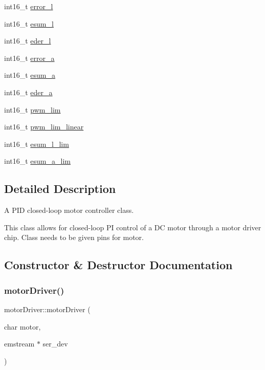 \begin{DoxyCompactItemize}
int16\+\_\+t \mbox{\hyperlink{classmotorDriver_a1167aa02f79f3ce85a38138b51e11c02}{error\+\_\+l}}
\item 
int16\+\_\+t \mbox{\hyperlink{classmotorDriver_aaa3f3b3f21f2b4be049289a28ee49c44}{esum\+\_\+l}}
\item 
int16\+\_\+t \mbox{\hyperlink{classmotorDriver_a5685e659a36278ead61528aaa5ae7df4}{eder\+\_\+l}}
\item 
int16\+\_\+t \mbox{\hyperlink{classmotorDriver_a5e3b5660f0764a6751b533893feb6b7b}{error\+\_\+a}}
\item 
int16\+\_\+t \mbox{\hyperlink{classmotorDriver_a8d327e1eed5b8eedf1b2289a675890f3}{esum\+\_\+a}}
\item 
int16\+\_\+t \mbox{\hyperlink{classmotorDriver_a3392381240d368f578b6f801984ac074}{eder\+\_\+a}}
\item 
int16\+\_\+t \mbox{\hyperlink{classmotorDriver_a54e6e6cddb7e7ef584cbe58449e08650}{pwm\+\_\+lim}}
\item 
int16\+\_\+t \mbox{\hyperlink{classmotorDriver_a842b7fc2c8401ae9a2919982c746da6d}{pwm\+\_\+lim\+\_\+linear}}
\item 
int16\+\_\+t \mbox{\hyperlink{classmotorDriver_a43969a01dd52d129d84243585dc996a9}{esum\+\_\+l\+\_\+lim}}
\item 
int16\+\_\+t \mbox{\hyperlink{classmotorDriver_a149914d07b894ca8201e6e9954862072}{esum\+\_\+a\+\_\+lim}}
\end{DoxyCompactItemize}


\subsection{Detailed Description}
A P\+ID closed-\/loop motor controller class. 

This class allows for closed-\/loop PI control of a DC motor through a motor driver chip. Class needs to be given pins for motor. 

\subsection{Constructor \& Destructor Documentation}
\mbox{\label{classmotorDriver_accdc35f52d3eba2302b2abb40566e271}} 
\subsubsection{\texorpdfstring{motorDriver()}{motorDriver()}}
{\footnotesize\ttfamily motor\+Driver\+::motor\+Driver (\begin{DoxyParamCaption}\item[{char}]{motor,  }\item[{emstream $\ast$}]{ser\+\_\+dev }\end{DoxyParamCaption})}



